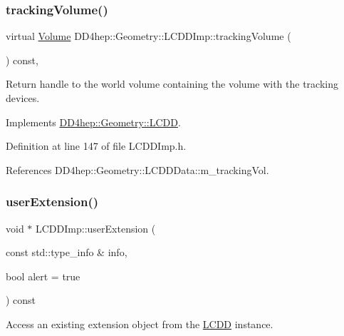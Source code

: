 \subsubsection{\texorpdfstring{tracking\+Volume()}{trackingVolume()}}
{\footnotesize\ttfamily virtual \hyperlink{class_d_d4hep_1_1_geometry_1_1_volume}{Volume} D\+D4hep\+::\+Geometry\+::\+L\+C\+D\+D\+Imp\+::tracking\+Volume (\begin{DoxyParamCaption}{ }\end{DoxyParamCaption}) const\hspace{0.3cm}{\ttfamily [inline]}, {\ttfamily [virtual]}}



Return handle to the world volume containing the volume with the tracking devices. 



Implements \hyperlink{class_d_d4hep_1_1_geometry_1_1_l_c_d_d_a351b289056485f960e9121382018c92b}{D\+D4hep\+::\+Geometry\+::\+L\+C\+DD}.



Definition at line 147 of file L\+C\+D\+D\+Imp.\+h.



References D\+D4hep\+::\+Geometry\+::\+L\+C\+D\+D\+Data\+::m\+\_\+tracking\+Vol.

\hypertarget{class_d_d4hep_1_1_geometry_1_1_l_c_d_d_imp_a70ec931894a57b006aea63beddd38263}{}\label{class_d_d4hep_1_1_geometry_1_1_l_c_d_d_imp_a70ec931894a57b006aea63beddd38263} 
\subsubsection{\texorpdfstring{user\+Extension()}{userExtension()}}
{\footnotesize\ttfamily void $\ast$ L\+C\+D\+D\+Imp\+::user\+Extension (\begin{DoxyParamCaption}\item[{const std\+::type\+\_\+info \&}]{info,  }\item[{bool}]{alert = {\ttfamily true} }\end{DoxyParamCaption}) const\hspace{0.3cm}{\ttfamily [virtual]}}



Access an existing extension object from the \hyperlink{class_d_d4hep_1_1_geometry_1_1_l_c_d_d}{L\+C\+DD} instance. 



